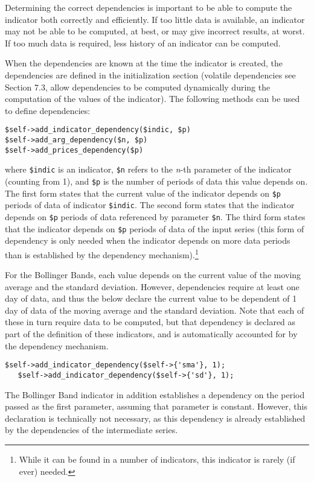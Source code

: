 \documentclass[11pt,twoside]{article}
\begin{document}
Determining the correct dependencies is important to be able to compute
the indicator both correctly and efficiently. If too little data is
available, an indicator may not be able to be computed, at best, or may
give incorrect results, at worst. If too much data is required, less
history of an indicator can be computed.

When the dependencies are known at the time the indicator is created,
the dependencies are defined in the initialization section (volatile
dependencies see Section 7.3, allow dependencies to be computed
dynamically during the computation of the values of the indicator). The
following methods can be used to define dependencies:
\begin{lstlisting}[numbers=none]
$self->add_indicator_dependency($indic, $p)
$self->add_arg_dependency($n, $p)
$self->add_prices_dependency($p)
\end{lstlisting}

where \lstinline!$indic! is an indicator,
\lstinline!$n! refers to the \textit{n}-th parameter of the
indicator (counting from 1), and \lstinline!$p! is the number
of periods of data this value depends on. The first form states that
the current value of the indicator depends on \lstinline!$p!
periods of data of indicator \lstinline!$indic!. The second
form states that the indicator depends on \lstinline!$p!
periods of data referenced by parameter \lstinline!$n!. The
third form states that the indicator depends on \lstinline!$p!
periods of data of the input series (this form of dependency is only
needed when the indicator depends on more data periods than is
established by the dependency mechanism).\footnote{While it can be
found in a number of indicators, this indicator is rarely (if ever)
needed.}

For the Bollinger Bands, each value depends on the current value of the
moving average and the standard deviation. However, dependencies
require at least one day of data, and thus the below declare the
current value to be dependent of 1 day of data of the moving average
and the standard deviation. Note that each of these in turn require
data to be computed, but that dependency is declared as part of the
definition of these indicators, and is automatically accounted for by
the dependency mechanism.

\begin{lstlisting}[name=example]
   $self->add_indicator_dependency($self->{'sma'}, 1);
   $self->add_indicator_dependency($self->{'sd'}, 1);
\end{lstlisting}
The Bollinger Band indicator in addition establishes a dependency on the
period passed as the first parameter, assuming that parameter is
constant. However, this declaration is technically not necessary, as
this dependency is already established by the dependencies of the
intermediate series.
\end{document}
